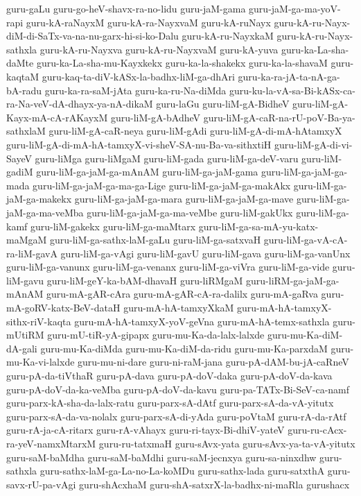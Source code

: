 {guru-gaLu
guru-go-heV-shavx-ra-no-lidu
guru-jaM-gama
guru-jaM-ga-ma-yoV-rapi
guru-kA-raNayxM
guru-kA-ra-NayxvaM
guru-kA-ruNayx
guru-kA-ru-Nayx-diM-di-SaTx-va-na-nu-garx-hi-si-ko-Dalu
guru-kA-ru-NayxkaM
guru-kA-ru-Nayx-sathxla
guru-kA-ru-Nayxva
guru-kA-ru-NayxvaM
guru-kA-yuva
guru-ka-La-sha-daMte
guru-ka-La-sha-mu-Kayxkekx
guru-ka-la-shakekx
guru-ka-la-shavaM
guru-kaqtaM
guru-kaq-ta-diV-kASx-la-badhx-liM-ga-dhAri
guru-ka-ra-jA-ta-nA-ga-bA-radu
guru-ka-ra-saM-jAta
guru-ka-ru-Na-diMda
guru-ku-la-vA-sa-Bi-kASx-ca-ra-Na-veV-dA-dhayx-ya-nA-dikaM
guru-laGu
guru-liM-gA-BidheV
guru-liM-gA-Kayx-mA-cA-rAKayxM
guru-liM-gA-bAdheV
guru-liM-gA-caR-na-rU-poV-Ba-ya-sathxlaM
guru-liM-gA-caR-neya
guru-liM-gAdi
guru-liM-gA-di-mA-hAtamxyX
guru-liM-gA-di-mA-hA-tamxyX-vi-sheV-SA-nu-Ba-va-sithxtiH
guru-liM-gA-di-vi-SayeV
guru-liMga
guru-liMgaM
guru-liM-gada
guru-liM-ga-deV-varu
guru-liM-gadiM
guru-liM-ga-jaM-ga-mAnAM
guru-liM-ga-jaM-gama
guru-liM-ga-jaM-ga-mada
guru-liM-ga-jaM-ga-ma-ga-Lige
guru-liM-ga-jaM-ga-makAkx
guru-liM-ga-jaM-ga-makekx
guru-liM-ga-jaM-ga-mara
guru-liM-ga-jaM-ga-mave
guru-liM-ga-jaM-ga-ma-veMba
guru-liM-ga-jaM-ga-ma-veMbe
guru-liM-gakUkx
guru-liM-ga-kamf
guru-liM-gakekx
guru-liM-ga-maMtarx
guru-liM-ga-sa-mA-yu-katx-maMgaM
guru-liM-ga-sathx-laM-gaLu
guru-liM-ga-satxvaH
guru-liM-ga-vA-cA-ra-liM-gavA
guru-liM-ga-vAgi
guru-liM-gavU
guru-liM-gava
guru-liM-ga-vanUnx
guru-liM-ga-vanunx
guru-liM-ga-venanx
guru-liM-ga-viVra
guru-liM-ga-vide
guru-liM-gavu
guru-liM-geY-ka-bAM-dhavaH
guru-liRMgaM
guru-liRM-ga-jaM-ga-mAnAM
guru-mA-gAR-cAra
guru-mA-gAR-cA-ra-dalilx
guru-mA-gaRva
guru-mA-goRV-katx-BeV-dataH
guru-mA-hA-tamxyXkaM
guru-mA-hA-tamxyX-sithx-riV-kaqta
guru-mA-hA-tamxyX-yoV-geVna
guru-mA-hA-temx-sathxla
guru-mUtiRM
guru-mU-tiR-yA-gipapx
guru-mu-Ka-da-lalx-lalxde
guru-mu-Ka-diM-dA-gali
guru-mu-Ka-diMda
guru-mu-Ka-diM-da-ridu
guru-mu-Ka-parxdaM
guru-mu-Ka-vi-lalxde
guru-mu-ni-dare
guru-ni-raM-jana
guru-pA-dAM-bu-jA-caRneV
guru-pA-da-tiVthaR
guru-pA-dava
guru-pA-doV-daka
guru-pA-doV-da-kava
guru-pA-doV-da-ka-veMba
guru-pA-doV-da-kavu
guru-pa-TATx-Bi-SeV-ca-namf
guru-parx-kA-sha-da-lalx-ratu
guru-parx-sA-dAtf
guru-parx-sA-da-vA-yitutx
guru-parx-sA-da-va-nolalx
guru-parx-sA-di-yAda
guru-poVtaM
guru-rA-da-rAtf
guru-rA-ja-cA-ritarx
guru-rA-vAhayx
guru-ri-tayx-Bi-dhiV-yateV
guru-ru-cAcx-ra-yeV-namxMtarxM
guru-ru-tatxmaH
guru-sAvx-yata
guru-sAvx-ya-ta-vA-yitutx
guru-saM-baMdha
guru-saM-baMdhi
guru-saM-jecnxya
guru-sa-ninxdhw
guru-sathxla
guru-sathx-laM-ga-La-no-La-koMDu
guru-sathx-lada
guru-satxthA
guru-savx-rU-pa-vAgi
guru-shAcxhaM
guru-shA-satxrX-la-badhx-ni-maRla
gurushacx
}
